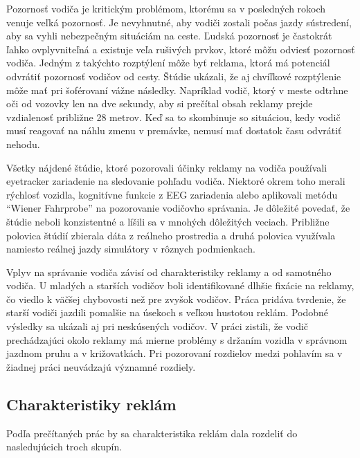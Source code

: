 Pozornosť vodiča je kritickým problémom, ktorému sa v posledných rokoch venuje veľká pozornosť. Je nevyhnutné, aby vodiči zostali počas jazdy sústredení, aby sa vyhli nebezpečným situáciám na ceste. Ľudská pozornosť je častokrát ľahko ovplyvniteľná a existuje veľa rušivých prvkov, ktoré môžu odviesť pozornosť vodiča. Jedným z takýchto rozptýlení môže byť reklama, ktorá má potenciál odvrátiť pozornosť vodičov od cesty. Štúdie ukázali, že aj chvíľkové rozptýlenie môže mať pri šoférovaní vážne následky. Napríklad vodič, ktorý v meste odtrhne oči od vozovky len na dve sekundy, aby si prečítal obsah reklamy prejde vzdialenosť približne 28 metrov. Keď sa to skombinuje so situáciou, kedy vodič musí reagovať na náhlu zmenu v premávke, nemusí mať dostatok času odvrátiť nehodu. %

Všetky nájdené štúdie, ktoré pozorovali účinky reklamy na vodiča používali eyetracker zariadenie na sledovanie pohľadu vodiča. Niektoré okrem toho merali rýchlosť vozidla, kognitívne funkcie z EEG zariadenia alebo aplikovali metódu “Wiener Fahrprobe” \cite{WF} na pozorovanie vodičovho správania. Je dôležité povedať, že štúdie neboli konzistentné a líšili sa v mnohých dôležitých veciach. Približne polovica štúdií zbierala dáta z reálneho prostredia a druhá polovica využívala namiesto reálnej jazdy simulátory v rôznych podmienkach.

Vplyv na správanie vodiča závisí od charakteristiky reklamy a od samotného vodiča. U mladých \cite{stavrinos2016visual} a starších vodičov \cite{belyusar2016field, EDQUIST2011619} boli identifikované dlhšie fixácie na reklamy, čo viedlo k väčšej chybovosti než pre zvyšok vodičov. Práca \cite{horberry200813} pridáva tvrdenie, že starší vodiči jazdili pomalšie na úsekoch s veľkou hustotou reklám. Podobné výsledky sa ukázali aj pri neskúsených vodičov. V práci \cite{bendak2010role} zistili, že vodič prechádzajúci okolo reklamy má mierne problémy s držaním vozidla v správnom jazdnom pruhu a v križovatkách. Pri pozorovaní rozdielov medzi pohlavím sa v žiadnej práci neuvádzajú významné rozdiely.

\subsection{Charakteristiky reklám}

Podľa prečítaných prác by sa charakteristika reklám dala rozdeliť do nasledujúcich troch skupín.

